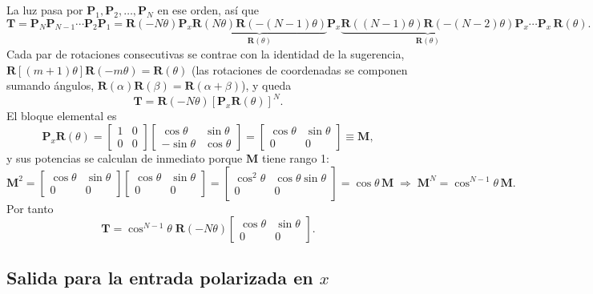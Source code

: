 \documentclass{article}
\newcommand{\Tm}{\mathbf{T}}
\newcommand{\Rm}{\mathbf{R}}
\newcommand{\Pm}{\mathbf{P}}
\begin{document}
La luz pasa por $\Pm_1,\Pm_2,\dots,\Pm_N$ en ese orden, así que
\[
\Tm=\Pm_N\Pm_{N-1}\cdots\Pm_2\Pm_1
=\Rm(-N\theta)\Pm_x\underbrace{\Rm(N\theta)\Rm(-(N-1)\theta)}_{\Rm(\theta)}\Pm_x
\underbrace{\Rm((N-1)\theta)\Rm(-(N-2)\theta)}_{\Rm(\theta)}\Pm_x\cdots\Pm_x\,\Rm(\theta).
\]
Cada par de rotaciones consecutivas se contrae con la identidad de la sugerencia,
$\Rm[(m+1)\theta]\Rm(-m\theta)=\Rm(\theta)$ (las rotaciones de coordenadas se componen sumando
ángulos, $\Rm(\alpha)\Rm(\beta)=\Rm(\alpha+\beta)$), y queda
\[
\Tm=\Rm(-N\theta)\left[\Pm_x\Rm(\theta)\right]^N .
\]
El bloque elemental es
\[
\Pm_x\Rm(\theta)=\begin{bmatrix}1&0\\0&0\end{bmatrix}
\begin{bmatrix}\cos\theta&\sin\theta\\-\sin\theta&\cos\theta\end{bmatrix}
=\begin{bmatrix}\cos\theta&\sin\theta\\0&0\end{bmatrix}\equiv\mathbf{M},
\]
y sus potencias se calculan de inmediato porque $\mathbf M$ tiene rango 1:
\[
\mathbf M^2=\begin{bmatrix}\cos\theta&\sin\theta\\0&0\end{bmatrix}
\begin{bmatrix}\cos\theta&\sin\theta\\0&0\end{bmatrix}
=\begin{bmatrix}\cos^2\theta&\cos\theta\sin\theta\\0&0\end{bmatrix}=\cos\theta\,\mathbf M
\;\Longrightarrow\;
\mathbf M^N=\cos^{N-1}\theta\,\mathbf M .
\]
Por tanto
\[
\Tm=\cos^{N-1}\theta\;\Rm(-N\theta)\begin{bmatrix}\cos\theta&\sin\theta\\0&0\end{bmatrix}.
\]

\subsection*{Salida para la entrada polarizada en $x$}
\end{document}
